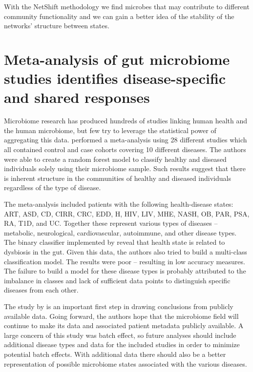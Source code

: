 With the NetShift methodology we find microbes that may contribute to different community functionality and we can gain a better idea of the stability of the networks' structure between states. 

\section{Meta-analysis of gut microbiome studies identifies disease-specific and shared responses}\label{relate-meta}

Microbiome research has produced hundreds of studies linking human health and the human microbiome, but few try to leverage the statistical power of aggregating this data. \citet{Duvallet2017} performed a meta-analysis using 28 different studies which all contained control and case cohorts covering 10 different diseases. The authors were able to create a random forest model to classify healthy and diseased individuals solely using their microbiome sample. Such results suggest that there is inherent structure in the communities of healthy and diseased individuals regardless of the type of disease.

The meta-analysis included patients with the following health-disease states: \acrfull{ART}, \acrfull{ASD}, \acrfull{CD}, \acrfull{CIRR}, \acrfull{CRC}, \acrfull{EDD}, \acrfull{H}, \acrfull{HIV}, \acrfull{LIV}, \acrfull{MHE}, \acrfull{NASH}, \acrfull{OB}, \acrfull{PAR}, \acrfull{PSA}, \acrfull{RA}, \acrfull{T1D}, and \acrfull{UC}. Together these represent various types of diseases -- metabolic, neurological, cardiovascular, autoimmune, and other disease types. The binary classifier implemented by \citeauthor{Duvallet2017} reveal that health state is related to dysbiosis in the gut. Given this data, the authors also tried to build a multi-class classification model. The results were poor -- resulting in low accuracy measures. The failure to build a model for these disease types is probably attributed to the imbalance in classes and lack of sufficient data points to distinguish specific diseases from each other.  

The study by \citet{Duvallet2017} is an important first step in drawing conclusions from publicly available data. Going forward, the authors hope that the microbiome field will continue to make its data and associated patient metadata publicly available. A large concern of this study was batch effect, so future analyses should include additional disease types and data for the included studies in order to minimize potential batch effects. With additional data there should also be a better representation of possible microbiome states associated with the various diseases. 